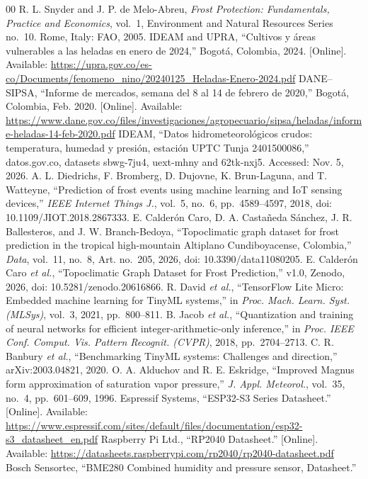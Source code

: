 \documentclass[conference]{IEEEtran}
\begin{document}
\begin{thebibliography}{00}
 R. L. Snyder and J. P. de Melo-Abreu, \textit{Frost Protection: Fundamentals, Practice and Economics}, vol.~1, Environment and Natural Resources Series no.~10. Rome, Italy: FAO, 2005.
 IDEAM and UPRA, ``Cultivos y \'areas vulnerables a las heladas en enero de 2024,'' Bogot\'a, Colombia, 2024. [Online]. Available: \url{https://upra.gov.co/es-co/Documents/fenomeno_nino/20240125_Heladas-Enero-2024.pdf}
 DANE--SIPSA, ``Informe de mercados, semana del 8 al 14 de febrero de 2020,'' Bogot\'a, Colombia, Feb. 2020. [Online]. Available: \url{https://www.dane.gov.co/files/investigaciones/agropecuario/sipsa/heladas/informe-heladas-14-feb-2020.pdf}
 IDEAM, ``Datos hidrometeorol\'ogicos crudos: temperatura, humedad y presi\'on, estaci\'on UPTC Tunja 2401500086,'' datos.gov.co, datasets sbwg-7ju4, uext-mhny and 62tk-nxj5. Accessed: Nov. 5, 2026.
 A. L. Diedrichs, F. Bromberg, D. Dujovne, K. Brun-Laguna, and T. Watteyne, ``Prediction of frost events using machine learning and IoT sensing devices,'' \textit{IEEE Internet Things J.}, vol.~5, no.~6, pp.~4589--4597, 2018, doi: 10.1109/JIOT.2018.2867333.
 E. Calder\'on Caro, D. A. Casta\~neda S\'anchez, J. R. Ballesteros, and J. W. Branch-Bedoya, ``Topoclimatic graph dataset for frost prediction in the tropical high-mountain Altiplano Cundiboyacense, Colombia,'' \textit{Data}, vol.~11, no.~8, Art. no.~205, 2026, doi: 10.3390/data11080205.
 E. Calder\'on Caro \textit{et al.}, ``Topoclimatic Graph Dataset for Frost Prediction,'' v1.0, Zenodo, 2026, doi: 10.5281/zenodo.20616866.
 R. David \textit{et al.}, ``TensorFlow Lite Micro: Embedded machine learning for TinyML systems,'' in \textit{Proc. Mach. Learn. Syst. (MLSys)}, vol.~3, 2021, pp.~800--811.
 B. Jacob \textit{et al.}, ``Quantization and training of neural networks for efficient integer-arithmetic-only inference,'' in \textit{Proc. IEEE Conf. Comput. Vis. Pattern Recognit. (CVPR)}, 2018, pp.~2704--2713.
 C. R. Banbury \textit{et al.}, ``Benchmarking TinyML systems: Challenges and direction,'' arXiv:2003.04821, 2020.
 O. A. Alduchov and R. E. Eskridge, ``Improved Magnus form approximation of saturation vapor pressure,'' \textit{J. Appl. Meteorol.}, vol.~35, no.~4, pp.~601--609, 1996.
 Espressif Systems, ``ESP32-S3 Series Datasheet.'' [Online]. Available: \url{https://www.espressif.com/sites/default/files/documentation/esp32-s3_datasheet_en.pdf}
 Raspberry Pi Ltd., ``RP2040 Datasheet.'' [Online]. Available: \url{https://datasheets.raspberrypi.com/rp2040/rp2040-datasheet.pdf}
 Bosch Sensortec, ``BME280 Combined humidity and pressure sensor, Datasheet.''
\end{thebibliography}
\end{document}
